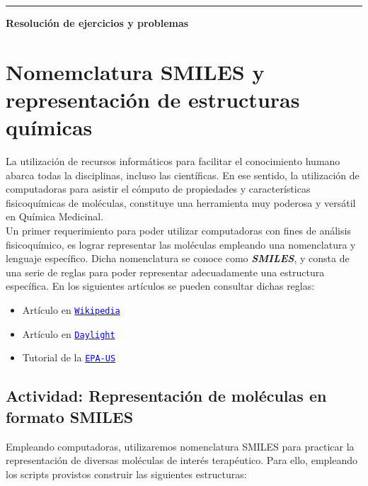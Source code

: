 \documentclass[12pt,a4paper]{article}
\begin{document}
\begin{center}
	\noindent\rule{14cm}{2pt}
\end{center}


\begin{center}
\textbf{\Large Resolución de ejercicios y problemas}
\end{center}


\section{Nomemclatura SMILES y representación de estructuras químicas}

La utilización de recursos informáticos para facilitar el conocimiento humano abarca todas la disciplinas, incluso las científicas. En ese sentido, la utilización de computadoras para asistir el cómputo de propiedades y características fisicoquímicas de moléculas, constituye una herramienta muy poderosa y versátil en Química Medicinal.\\

Un primer requerimiento para poder utilizar computadoras con fines de análisis fisicoquímico, es lograr representar las moléculas empleando una nomenclatura y lenguaje específico. Dicha nomenclatura se conoce como \textbf{\textit{SMILES}}, y consta de una serie de reglas para poder representar adecuadamente una estructura específica. En los siguientes artículos se pueden consultar dichas reglas:

\begin{itemize}
	\item Artículo en \href{https://es.wikipedia.org/wiki/SMILES}{\textcolor{blue}{\texttt{Wikipedia}}}
	\item Artículo en \href{https://www.daylight.com/dayhtml/doc/theory/theory.smiles.html}{\textcolor{blue}{\texttt{Daylight}}}
	\item Tutorial de la \href{https://archive.epa.gov/med/med_archive_03/web/html/smiles.html}{\textcolor{blue}{\texttt{EPA-US}}}	
\end{itemize}

\subsection{Actividad: Representación de moléculas en formato SMILES}

Empleando computadoras, utilizaremos nomenclatura SMILES para practicar la representación de diversas moléculas de interés terapéutico. Para ello, empleando los scripts provistos construir las siguientes estructuras:
\end{document}
